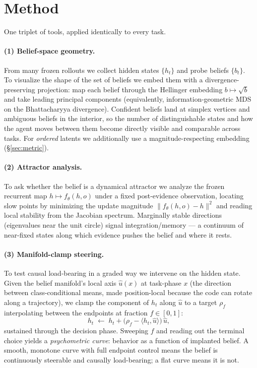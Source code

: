 \documentclass[11pt]{article}
\begin{document}
\section{Method}
\label{sec:method}
One triplet of tools, applied identically to every task.

\paragraph{(1) Belief-space geometry.} From many frozen rollouts we collect hidden
states $\{h_t\}$ and probe beliefs $\{b_t\}$. To visualize the shape of the set of
beliefs we embed them with a divergence-preserving projection: map each belief
through the Hellinger embedding $b \mapsto \sqrt{b}$ and take leading principal
components (equivalently, information-geometric MDS on the Bhattacharyya
divergence). Confident beliefs land at simplex vertices and ambiguous beliefs in
the interior, so the number of distinguishable states and how the agent moves
between them become directly visible and comparable across tasks. For
\emph{ordered} latents we additionally use a magnitude-respecting embedding
(\S\ref{sec:metric}).

\paragraph{(2) Attractor analysis.} To ask whether the belief is a dynamical
attractor we analyze the frozen recurrent map $h \mapsto f_\theta(h,o)$ under a
fixed post-evidence observation, locating slow points by minimizing the update
magnitude $\lVert f_\theta(h,o) - h\rVert^2$ and reading local stability from the
Jacobian spectrum. Marginally stable directions (eigenvalues near the unit circle)
signal integration/memory --- a continuum of near-fixed states along which evidence
pushes the belief and where it rests.

\paragraph{(3) Manifold-clamp steering.} To test causal load-bearing in a graded
way we intervene on the hidden state. Given the belief manifold's local axis
$\hat u(x)$ at task-phase $x$ (the direction between class-conditional means, made
position-local because the code can rotate along a trajectory), we clamp the
component of $h_t$ along $\hat u$ to a target $\rho_f$ interpolating between the
endpoints at fraction $f\in[0,1]$:
\[
  h_t \;\leftarrow\; h_t + \big(\rho_f - \langle h_t, \hat u\rangle\big)\,\hat u,
\]
sustained through the decision phase. Sweeping $f$ and reading out the terminal
choice yields a \emph{psychometric curve}: behavior as a function of implanted
belief. A smooth, monotone curve with full endpoint control means the belief is
continuously steerable and causally load-bearing; a flat curve means it is not.
\end{document}
